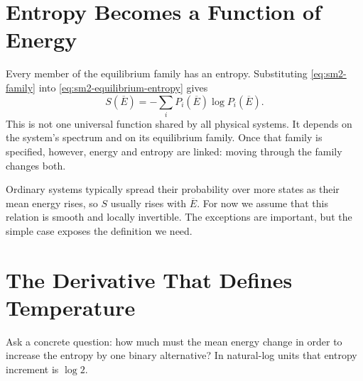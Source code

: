 \begin{classroomqa}
\end{classroomqa}

\begin{classroomqa}
\end{classroomqa}

\section{Entropy Becomes a Function of Energy}

Every member of the equilibrium family has an entropy. Substituting
\eqref{eq:sm2-family} into \eqref{eq:sm2-equilibrium-entropy} gives
\begin{equation}
 S(\overline E)
 =-\sum_iP_i(\overline E)\log P_i(\overline E).
 \label{eq:sm2-entropy-energy}
\end{equation}
This is not one universal function shared by all physical systems. It depends
on the system's spectrum and on its equilibrium family. Once that family is
specified, however, energy and entropy are linked: moving through the family
changes both.

Ordinary systems typically spread their probability over more states as their
mean energy rises, so \(S\) usually rises with \(\overline E\). For now we
assume that this relation is smooth and locally invertible. The exceptions are
important, but the simple case exposes the definition we need.

\section{The Derivative That Defines Temperature}

Ask a concrete question: how much must the mean energy change in order to
increase the entropy by one binary alternative? In natural-log units that
entropy increment is \(\log2\).

